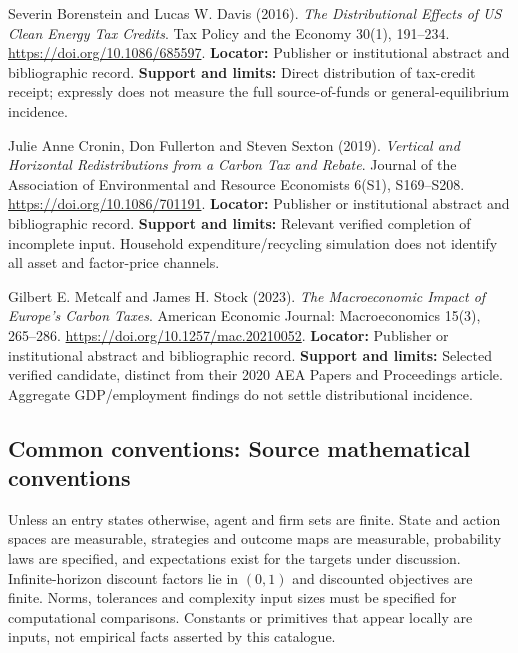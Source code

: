 \documentclass[11pt,a4paper]{article}
\begin{document}
\begin{enumerate}[label={[\textnormal{S}\arabic*]},leftmargin=*]

\item Severin Borenstein and Lucas W. Davis (2016). \emph{The Distributional Effects of US Clean Energy Tax Credits}. Tax Policy and the Economy 30(1), 191–234. \url{https://doi.org/10.1086/685597}. \textbf{Locator:} Publisher or institutional abstract and bibliographic record. \textbf{Support and limits:} Direct distribution of tax-credit receipt; expressly does not measure the full source-of-funds or general-equilibrium incidence.

\item Julie Anne Cronin, Don Fullerton and Steven Sexton (2019). \emph{Vertical and Horizontal Redistributions from a Carbon Tax and Rebate}. Journal of the Association of Environmental and Resource Economists 6(S1), S169–S208. \url{https://doi.org/10.1086/701191}. \textbf{Locator:} Publisher or institutional abstract and bibliographic record. \textbf{Support and limits:} Relevant verified completion of incomplete input. Household expenditure/recycling simulation does not identify all asset and factor-price channels.

\item Gilbert E. Metcalf and James H. Stock (2023). \emph{The Macroeconomic Impact of Europe’s Carbon Taxes}. American Economic Journal: Macroeconomics 15(3), 265–286. \url{https://doi.org/10.1257/mac.20210052}. \textbf{Locator:} Publisher or institutional abstract and bibliographic record. \textbf{Support and limits:} Selected verified candidate, distinct from their 2020 AEA Papers and Proceedings article. Aggregate GDP/employment findings do not settle distributional incidence.

\end{enumerate}

\subsection*{Common conventions: Source mathematical conventions}

Unless an entry states otherwise, agent and firm sets are finite. State and action spaces are measurable, strategies and outcome maps are measurable, probability laws are specified, and expectations exist for the targets under discussion. Infinite-horizon discount factors lie in $(0,1)$ and discounted objectives are finite. Norms, tolerances and complexity input sizes must be specified for computational comparisons. Constants or primitives that appear locally are inputs, not empirical facts asserted by this catalogue.
\end{document}
